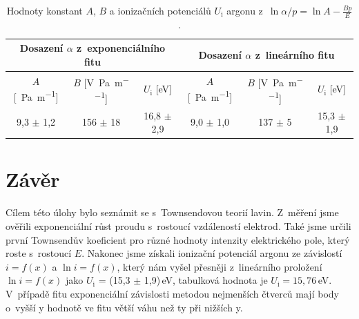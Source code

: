\documentclass[a4paper,12pt]{article}
\begin{document}
\begin{center}
	\begin{table}[h]
		\centering
		\caption{Hodnoty konstant $A$, $B$ a ionizačních potenciálů $U_\text{i}$ 
		argonu z~$\ln \alpha/p = \ln A - \frac{Bp}{E}$.}
		\label{tab2}
		\begin{tabular}{|c|c|c|c|c|c|} \hline
			\multicolumn{3}{|c|}{Dosazení $\alpha$ z~exponenciálního fitu} & \multicolumn{3}{c|}{Dosazení $\alpha$ z~lineárního fitu}  \\ \hline
			$A$ [\si{\per\pascal\per\meter}] & $B$ [\si{\volt\per\pascal\per\meter}] & $U_\text{i}$ [eV] & $A$ [\si{\per\pascal\per\meter}] & $B$ [\si{\volt\per\pascal\per\meter}] & $U_\text{i}$ [eV] \\ \hline
			9,3 $\pm$ 1,2 & 156 $\pm$ 18 &  16,8 $\pm$ 2,9  & 9,0 $\pm$ 1,0 & 
			137 $\pm$ 5 & 15,3 $\pm$ 1,9\\ \hline
		\end{tabular}
	\end{table}
\end{center}

\newpage
\section{Závěr}
Cílem této úlohy bylo seznámit se s~Townsendovou teorií lavin. Z~měření jsme 
ověřili exponenciální růst proudu s~rostoucí vzdáleností elektrod. Také jsme 
určili první Townsendův koeficient pro různé hodnoty intenzity elektrického 
pole, který roste s~rostoucí $E$. Nakonec jsme získali ionizační potenciál 
argonu ze závislostí $i = f(x)$ a $\ln i = f(x)$, který nám vyšel přesněji
z~lineárního proložení $\ln i = f(x)$ jako $U_\text{i}$ = (15,3 $\pm$  1,9)\,eV, 
tabulková hodnota je $U_\text{i} = 15,76$\,eV. V~případě fitu exponenciální závislosti metodou nejmenších čtverců mají body o~vyšší y hodnotě ve fitu větší váhu než ty při nižších y. 
\end{document}
